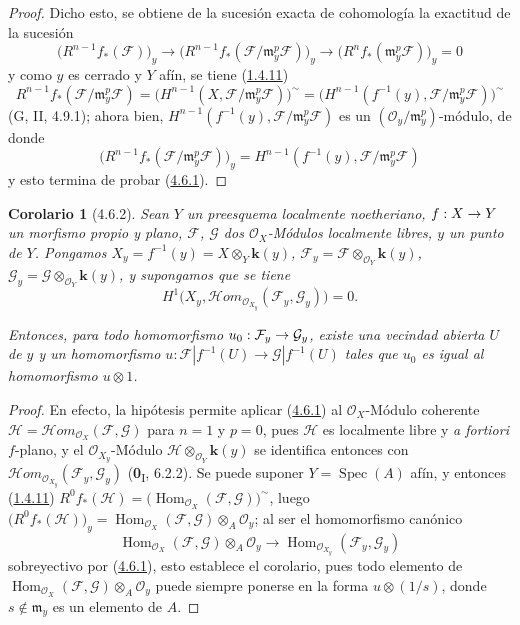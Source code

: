 \documentclass[10pt,oneside,openany]{book}
\theoremstyle{egaenv}\newtheorem*{env}{---}
\theoremstyle{egastatement}
\newtheorem*{corollary}{Corolario}
\theoremstyle{egadescription}
\renewcommand{\to}{\mathchoice{\longrightarrow}{\rightarrow}{\rightarrow}{\rightarrow}}
\begin{document}
\begin{proof}
Dicho esto, se obtiene de la sucesión exacta de cohomología la exactitud de la
sucesión
\[
\bigl(R^{n-1}f_*(\mathcal F)\bigr)_y
\longrightarrow
\bigl(R^{n-1}f_*(\mathcal F/\mathfrak m_y^p\mathcal F)\bigr)_y
\longrightarrow
\bigl(R^nf_*(\mathfrak m_y^p\mathcal F)\bigr)_y=0
\]
y como $y$ es cerrado y $Y$ afín, se tiene (\hyperref[III.1.4.11-fr]{1.4.11})
\[
R^{n-1}f_*(\mathcal F/\mathfrak m_y^p\mathcal F)
=\bigl(H^{n-1}(X,\mathcal F/\mathfrak m_y^p\mathcal F)\bigr)^\sim
=\bigl(H^{n-1}(f^{-1}(y),
\mathcal F/\mathfrak m_y^p\mathcal F)\bigr)^\sim
\]
(G, II, 4.9.1); ahora bien,
$H^{n-1}(f^{-1}(y),\mathcal F/\mathfrak m_y^p\mathcal F)$ es un
$(\mathcal O_y/\mathfrak m_y^p)$-módulo, de donde
\[
\bigl(R^{n-1}f_*(\mathcal F/\mathfrak m_y^p\mathcal F)\bigr)_y
=H^{n-1}(f^{-1}(y),\mathcal F/\mathfrak m_y^p\mathcal F)
\]
y esto termina de probar (\hyperref[III.4.6.1-fr]{4.6.1}).
\end{proof}

\begin{corollary}[4.6.2]
\label{III.4.6.2-fr}
Sean $Y$ un preesquema localmente noetheriano, $f:X\to Y$ un morfismo propio
y plano, $\mathcal F$, $\mathcal G$ dos $\mathcal O_X$-Módulos localmente
libres, $y$ un punto de $Y$. Pongamos
$X_y=f^{-1}(y)=X\otimes_Y\boldsymbol{k}(y)$,
$\mathcal F_y=\mathcal F\otimes_{\mathcal O_Y}\boldsymbol{k}(y)$,
$\mathcal G_y=\mathcal G\otimes_{\mathcal O_Y}\boldsymbol{k}(y)$,
y supongamos que se tiene
\[
\label{III.4.6.2.1-fr}
H^1\bigl(X_y,
\mathcal{H}\!om_{\mathcal O_{X_y}}(\mathcal F_y,\mathcal G_y)\bigr)=0.
\tag{4.6.2.1}
\]

Entonces, para todo homomorfismo $u_0:\mathcal F_y\to\mathcal G_y$, existe
una vecindad abierta $U$ de $y$ y un homomorfismo
$u:\mathcal F|f^{-1}(U)\longrightarrow\mathcal G|f^{-1}(U)$
tales que $u_0$ es igual al homomorfismo $u\otimes1$.
\end{corollary}

\begin{proof}
En efecto, la hipótesis permite aplicar (\hyperref[III.4.6.1-fr]{4.6.1}) al
$\mathcal O_X$-Módulo coherente
$\mathcal H=\mathcal{H}\!om_{\mathcal O_X}(\mathcal F,\mathcal G)$ para
$n=1$ y $p=0$, pues $\mathcal H$ es localmente libre y \emph{a fortiori}
$f$-plano, y el $\mathcal O_{X_y}$-Módulo
$\mathcal H\otimes_{\mathcal O_Y}\boldsymbol{k}(y)$ se identifica entonces con
$\mathcal{H}\!om_{\mathcal O_{X_y}}(\mathcal F_y,\mathcal G_y)$
(\textbf{0}\textsubscript{I}, 6.2.2). Se puede suponer $Y=\operatorname{Spec}(A)$
afín, y entonces (\hyperref[III.1.4.11-fr]{1.4.11})
$R^0f_*(\mathcal H)=
\bigl(\operatorname{Hom}_{\mathcal O_X}(\mathcal F,\mathcal G)\bigr)^\sim$,
luego
$\bigl(R^0f_*(\mathcal H)\bigr)_y
=\operatorname{Hom}_{\mathcal O_X}(\mathcal F,\mathcal G)
\otimes_A\mathcal O_y$;
al ser el homomorfismo canónico
\[
\operatorname{Hom}_{\mathcal O_X}(\mathcal F,\mathcal G)
\otimes_A\mathcal O_y
\longrightarrow
\operatorname{Hom}_{\mathcal O_{X_y}}(\mathcal F_y,\mathcal G_y)
\]
sobreyectivo por (\hyperref[III.4.6.1-fr]{4.6.1}), esto establece el
corolario, pues todo elemento de
$\operatorname{Hom}_{\mathcal O_X}(\mathcal F,\mathcal G)
\otimes_A\mathcal O_y$ puede siempre ponerse en la forma
$u\otimes(1/s)$, donde $s\notin\mathfrak m_y$ es un elemento de $A$.
\end{proof}
\end{document}
